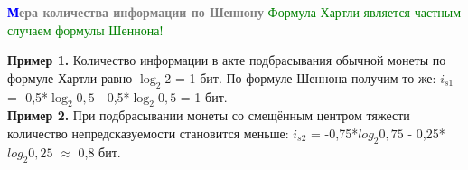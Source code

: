 \begin{frame}{\hspace{4cm}\textbf{\textcolor{blue}{М}\textcolor{gray}{ера количества информации по Шеннону}}}
    \medskip
    \fontsize{11pt}{13pt}\selectfont\textcolor{Green}{Формула Хартли является частным случаем формулы Шеннона!}
    
    \smallskip
    \fontsize{9pt}{11pt}\selectfont\noindent\textbf{Пример 1.} Количество информации в акте подбрасывания обычной монеты по формуле Хартли равно $\log_2 2$ = 1 бит. По формуле Шеннона получим то же: $i_{s1}$ = -0,5*$\log_2 0,5$ - 0,5*$\log_2 0,5$ = 1 бит.\\
    \noindent\textbf{Пример 2.} При подбрасывании монеты со смещённым центром тяжести количество непредсказуемости становится меньше: $i_{s2}$ = -0,75*$log_2 0,75$ - 0,25*$log_2 0,25$ $\approx$ 0,8 бит. 

\end{frame}
